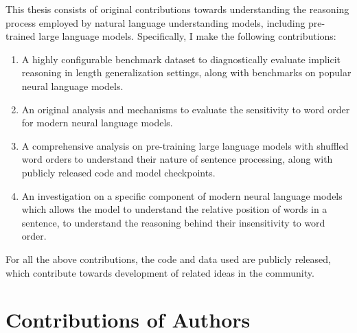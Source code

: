 \documentclass[letterpaper, 12pt]{report}
\begin{document}
This thesis consists of original contributions towards understanding the reasoning process employed by natural language understanding models, including pre-trained large language models. Specifically, I make the following contributions:

\begin{enumerate}
  \item A highly configurable benchmark dataset to diagnostically evaluate implicit reasoning in length generalization settings, along with benchmarks on popular neural language models.
  \item An original analysis and mechanisms to evaluate the sensitivity to word order for modern neural language models.
  \item A comprehensive analysis on pre-training large language models with shuffled word orders to understand their nature of sentence processing, along with publicly released code and model checkpoints.
  \item An investigation on a specific component of modern neural language models which allows the model to understand the relative position of words in a sentence, to understand the reasoning behind their insensitivity to word order.
\end{enumerate}

For all the above contributions, the code and data used are publicly released, which contribute towards development of related ideas in the community.

\chapter*{Contributions of Authors}
\label{sec:cont_authors}
\end{document}

